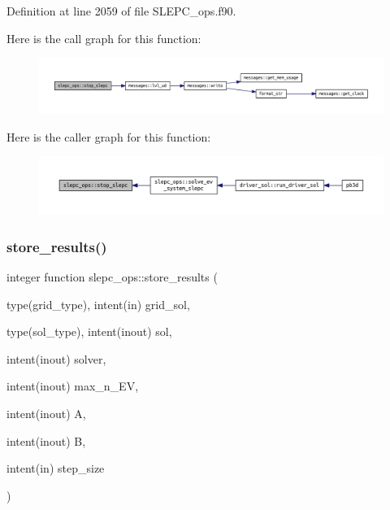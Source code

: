 Definition at line 2059 of file S\+L\+E\+P\+C\+\_\+ops.\+f90.

Here is the call graph for this function\+:
\nopagebreak
\begin{figure}[H]
\begin{center}
\leavevmode
\includegraphics[width=350pt]{namespaceslepc__ops_ae65ae217581e4b5986da87bc9a23acb8_cgraph}
\end{center}
\end{figure}
Here is the caller graph for this function\+:
\nopagebreak
\begin{figure}[H]
\begin{center}
\leavevmode
\includegraphics[width=350pt]{namespaceslepc__ops_ae65ae217581e4b5986da87bc9a23acb8_icgraph}
\end{center}
\end{figure}
\mbox{\label{namespaceslepc__ops_a66241540803bca208b2f3bd6b0448491}} 
\subsubsection{\texorpdfstring{store\+\_\+results()}{store\_results()}}
{\footnotesize\ttfamily integer function slepc\+\_\+ops\+::store\+\_\+results (\begin{DoxyParamCaption}\item[{type(grid\+\_\+type), intent(in)}]{grid\+\_\+sol,  }\item[{type(sol\+\_\+type), intent(inout)}]{sol,  }\item[{intent(inout)}]{solver,  }\item[{intent(inout)}]{max\+\_\+n\+\_\+\+EV,  }\item[{intent(inout)}]{A,  }\item[{intent(inout)}]{B,  }\item[{intent(in)}]{step\+\_\+size }\end{DoxyParamCaption})}



